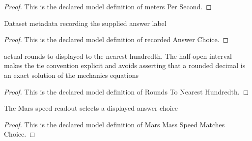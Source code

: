 \begin{proof}
  This is the declared model definition of meters Per Second.
\end{proof}
\begin{definition}
  \label{def:physics:phyx-mini-0773:phyxminiproblems-problemphyxmini0773-recordedanswerchoice}
  Dataset metadata recording the supplied answer label
\end{definition}
\begin{proof}
  This is the declared model definition of recorded Answer Choice.
\end{proof}
\begin{definition}
  \label{def:physics:phyx-mini-0773:phyxminiproblems-problemphyxmini0773-roundstonearesthundredth}
  actual rounds to displayed to the nearest hundredth. The half-open interval makes the tie convention explicit and avoids asserting that a rounded decimal is an exact solution of the mechanics equations
\end{definition}
\begin{proof}
  This is the declared model definition of Rounds To Nearest Hundredth.
\end{proof}
\begin{definition}
  \label{def:physics:phyx-mini-0773:phyxminiproblems-problemphyxmini0773-marsmassspeedmatcheschoice}
  The Mars speed readout selects a displayed answer choice
\end{definition}
\begin{proof}
  This is the declared model definition of Mars Mass Speed Matches Choice.
\end{proof}
